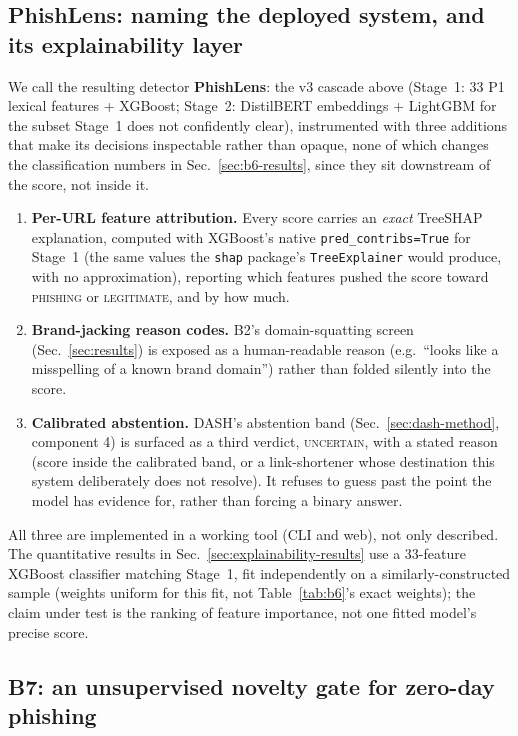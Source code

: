 \documentclass[conference]{IEEEtran}
\begin{document}
\subsection{PhishLens: naming the deployed system, and its explainability layer}
\label{sec:phishlens}

We call the resulting detector \textbf{PhishLens}: the v3 cascade above
(Stage~1: 33 P1 lexical features + XGBoost; Stage~2: DistilBERT embeddings
+ LightGBM for the subset Stage~1 does not confidently clear),
instrumented with three additions that make its decisions inspectable
rather than opaque, none of which changes the classification numbers in
Sec.~\ref{sec:b6-results}, since they sit downstream of the score, not
inside it.

\begin{enumerate}
\item \textbf{Per-URL feature attribution.} Every score carries an \emph{exact} TreeSHAP explanation, computed with
XGBoost's native \texttt{pred\_contribs=True} for Stage~1 (the same values
the \texttt{shap} package's \texttt{TreeExplainer} would produce, with no
approximation), reporting which features pushed the score toward
      \textsc{phishing} or \textsc{legitimate}, and by how much.
\item \textbf{Brand-jacking reason codes.} B2's domain-squatting screen
      (Sec.~\ref{sec:results}) is exposed as a human-readable reason
      (e.g.\ ``looks like a misspelling of a known brand domain'') rather
      than folded silently into the score.
\item \textbf{Calibrated abstention.} DASH's abstention band
      (Sec.~\ref{sec:dash-method}, component 4) is surfaced as a third
      verdict, \textsc{uncertain}, with a stated reason (score inside the
      calibrated band, or a link-shortener whose destination this system deliberately does not
      resolve). It refuses to guess past the point the model has evidence
      for, rather than forcing a binary answer.
\end{enumerate}

All three are implemented in a working tool (CLI and web), not only
described. The quantitative results in
Sec.~\ref{sec:explainability-results} use a 33-feature XGBoost classifier
matching Stage~1, fit independently on a similarly-constructed sample
(weights uniform for this fit, not Table~\ref{tab:b6}'s exact weights);
the claim under test is the ranking of feature importance, not one
fitted model's precise score.

\subsection{B7: an unsupervised novelty gate for zero-day phishing}
\label{sec:b7-method}
\end{document}
